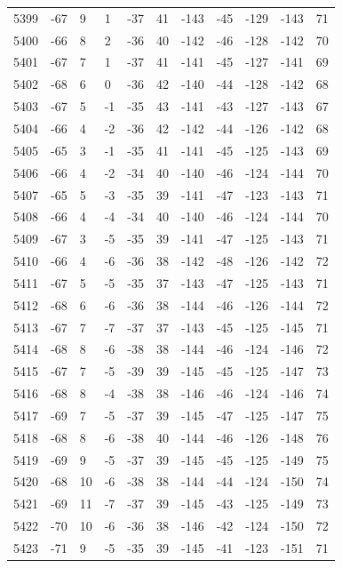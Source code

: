 \begin{table}[H]
\begin{tabular}{lllllllllll}
5399 & -67 & 9 & 1 & -37 & 41 & -143 & -45 & -129 & -143 & 71 \\
5400 & -66 & 8 & 2 & -36 & 40 & -142 & -46 & -128 & -142 & 70 \\
5401 & -67 & 7 & 1 & -37 & 41 & -141 & -45 & -127 & -141 & 69 \\
5402 & -68 & 6 & 0 & -36 & 42 & -140 & -44 & -128 & -142 & 68 \\
5403 & -67 & 5 & -1 & -35 & 43 & -141 & -43 & -127 & -143 & 67 \\
5404 & -66 & 4 & -2 & -36 & 42 & -142 & -44 & -126 & -142 & 68 \\
5405 & -65 & 3 & -1 & -35 & 41 & -141 & -45 & -125 & -143 & 69 \\
5406 & -66 & 4 & -2 & -34 & 40 & -140 & -46 & -124 & -144 & 70 \\
5407 & -65 & 5 & -3 & -35 & 39 & -141 & -47 & -123 & -143 & 71 \\
5408 & -66 & 4 & -4 & -34 & 40 & -140 & -46 & -124 & -144 & 70 \\
5409 & -67 & 3 & -5 & -35 & 39 & -141 & -47 & -125 & -143 & 71 \\
5410 & -66 & 4 & -6 & -36 & 38 & -142 & -48 & -126 & -142 & 72 \\
5411 & -67 & 5 & -5 & -35 & 37 & -143 & -47 & -125 & -143 & 71 \\
5412 & -68 & 6 & -6 & -36 & 38 & -144 & -46 & -126 & -144 & 72 \\
5413 & -67 & 7 & -7 & -37 & 37 & -143 & -45 & -125 & -145 & 71 \\
5414 & -68 & 8 & -6 & -38 & 38 & -144 & -46 & -124 & -146 & 72 \\
5415 & -67 & 7 & -5 & -39 & 39 & -145 & -45 & -125 & -147 & 73 \\
5416 & -68 & 8 & -4 & -38 & 38 & -146 & -46 & -124 & -146 & 74 \\
5417 & -69 & 7 & -5 & -37 & 39 & -145 & -47 & -125 & -147 & 75 \\
5418 & -68 & 8 & -6 & -38 & 40 & -144 & -46 & -126 & -148 & 76 \\
5419 & -69 & 9 & -5 & -37 & 39 & -145 & -45 & -125 & -149 & 75 \\
5420 & -68 & 10 & -6 & -38 & 38 & -144 & -44 & -124 & -150 & 74 \\
5421 & -69 & 11 & -7 & -37 & 39 & -145 & -43 & -125 & -149 & 73 \\
5422 & -70 & 10 & -6 & -36 & 38 & -146 & -42 & -124 & -150 & 72 \\
5423 & -71 & 9 & -5 & -35 & 39 & -145 & -41 & -123 & -151 & 71 \\

\end{tabular}
\end{table}
